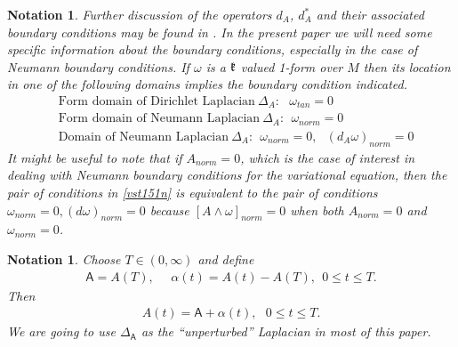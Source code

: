 \documentclass[12pt]{article}
\newtheorem{notation}[theorem]{Notation}
\def \As{\mathsf{A}}
\def \w{\omega}
\def \kf{\frak k}
\def \eref{\eqref}
\numberwithin{equation}{section}
\begin{document}
\begin{notation}
{ 
   Further discussion of the operators $d_A$, $d_A^*$ and their associated boundary conditions
 may be found in \cite[Section 3]{CG1}.   
  In the present paper we will need some  specific information
 about the boundary conditions, especially in the case of Neumann boundary conditions. 
 If  $\w$ is a $\kf$ valued 1-form over $M$ then its location in one of the following domains implies
 the boundary condition indicated. 
\begin{align}
&\text{Form domain of Dirichlet Laplacian}\ \Delta_A:\ \ \ \w_{tan} =0  \label{vst150d}\\
 &\text{Form domain of Neumann Laplacian}\ \Delta_A:\ \ \w_{norm} =0  \label{vst150n}\\
&\text{Domain of Neumann Laplacian}\ \Delta_A:\ \ \w_{norm} =0, \ \ \  (d_A \w)_{norm} =0  \label{vst151n}
\end{align}
It might be useful to note that if $A_{norm} =0$, which is the case of interest in dealing with Neumann
boundary conditions for the variational equation, then the pair of conditions in \eref{vst151n} is equivalent to 
the pair of  conditions $\w_{norm} = 0, (d\w)_{norm}= 0$ because $[A\wedge \w]_{norm} =0$ when
both $A_{norm} =0$ and $\w_{norm}=0$.
}
\end{notation}


\begin{notation}\label{notA} {\rm  Choose   $T \in (0, \infty)$  and define 
\begin{align}
\As = A(T), \ \ \ \ \ \ \alpha(t) = A(t) - A(T), \ \ 0\le t \le T.         \label{ps5}
\end{align}
Then
\begin{align}
A(t) = \As + \alpha(t),\ \ \ 0\le t \le T.               \label{ps7}
\end{align}
We are going to use $\Delta_\As$ as the ``unperturbed'' Laplacian in most of this paper.
}
\end{notation}
\end{document}
